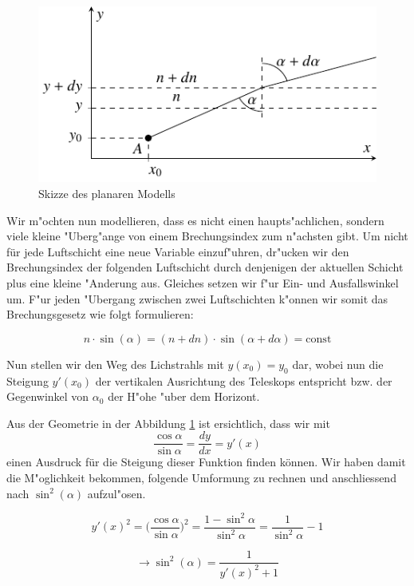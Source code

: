 \begin{refsection}
\begin{figure}
\centering
\includegraphics{licht/standalone/fig_planar_skizze.pdf}
\caption{Skizze des planaren Modells}
\label{fig:13_1}
\end{figure}

Wir m"ochten nun modellieren, dass es nicht einen haupts"achlichen, sondern viele kleine "Uberg"ange von einem Brechungsindex zum n"achsten gibt. 
Um nicht für jede Luftschicht eine neue Variable einzuf"uhren, dr"ucken wir den Brechungsindex der folgenden Luftschicht durch denjenigen der aktuellen Schicht plus eine kleine "Anderung aus. 
Gleiches setzen wir f"ur Ein- und Ausfallswinkel um. 
F"ur jeden "Ubergang zwischen zwei Luftschichten k"onnen wir somit das Brechungsgesetz wie folgt formulieren:

\begin{equation} \label{eq:13_1}
  n \cdot \sin(\alpha) = (n + dn) \cdot \sin(\alpha + d\alpha) = \text{const}
\end{equation}

Nun stellen wir den Weg des Lichstrahls mit $y(x_0) = y_0$ dar, wobei nun die Steigung $y'(x_0)$ der vertikalen Ausrichtung des Teleskops entspricht bzw. der Gegenwinkel von  $\alpha_0$ der H"ohe "uber dem Horizont.

Aus der Geometrie in der Abbildung \ref{fig:13_1} ist ersichtlich, dass wir mit 
$$\frac{\cos \alpha}{\sin \alpha} = \frac{dy}{dx} = y'(x)$$
einen Ausdruck für die Steigung dieser Funktion finden können. 
Wir haben damit die M"oglichkeit bekommen, folgende Umformung zu rechnen und anschliessend nach $\sin^2(\alpha)$ aufzul"osen.

$$ y'(x)^2 = \biggl(\frac{\cos \alpha}{\sin \alpha}\biggr)^2 = \frac{1 - \sin^2 \alpha}{\sin^2 \alpha} = \frac{1}{\sin^2 \alpha} - 1$$

\begin{equation} \label{eq:13_2}
\rightarrow \sin^2 (\alpha) = \frac{1}{y'(x)^2 + 1}
\end{equation}


\end{refsection}
